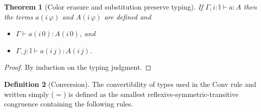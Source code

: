 \documentclass[english]{PaperTools/latex/entcs}
\theoremstyle{plain}
\newtheorem{theorem}{Theorem}
\theoremstyle{definition}
\newtheorem{definition}[theorem]{Definition}
\theoremstyle{remark}
\newcommand\CP[3]{(#2,_{#1} #3)}
\newcommand\CTimes[2]{(#2) ×_{#1}}
\newcommand\param[1]{\!\cdot\!#1}
\newcommand\op[1]{∋_{#1}}
\newcommand\fp[3]{⟨#2 ,_{#1} #3⟩}
\newcommand\mor[2]{({#1}\,{#2})}
\newcommand\proj[2]{{#2}\mor{#1}0}
\newcommand\comment[1]{}
\def\El#1{\mathrm{El}(#1)}
\begin{document}
\begin{theorem}[Color erasure and substitution preserve typing]
  If $Γ,i:𝕀  ⊢ a : A$ then the terms $a(i\,φ)$ and $A(i\,φ)$ are
  defined and
  \begin{itemize}
    \item $Γ ⊢ a(i\,0) : A(i\,0)$, and
    \item $Γ, j :𝕀 ⊢ a(i\,j) : A(i\,j)$.
  \end{itemize}
\end{theorem}
\begin{proof}
  By induction on the typing judgment.
\end{proof}

\comment{
\begin{definition}[Normal forms and neutral terms]~
  \begin{align*}
    \mathsf{Nf} ∋ u,v,A,B & \coloneqq
      U \mid λx:A. t \mid (x:A) → B \\
      & \mid \CP i u v \mid \fp i u v \\
      & \mid {(\CTimes {i₀} A B)} \op {i₁} {u_1 \cdots} \op {i_n} {u_n} &\quad \text{($i₀ \prec i₁ \prec \ldots \prec i_n$)} \\
      & \mid s \param {i₀} \cdots \param {i_{n-1}}                  &\quad \text{($i₀ \prec   < \ldots \prec i_{n-1}$)}
    \\
    \mathsf{Ne} ∋ s & \coloneqq x \mid s \, u
  \end{align*}
\end{definition}
}

\begin{definition}[Conversion]
\label{def:conversion}
The convertibility of types used in the {\sc Conv} rule and written
simply ($=$) is defined as the smallest reflexive-symmetric-transitive
congruence containing the following rules.
\end{definition}
\end{document}
